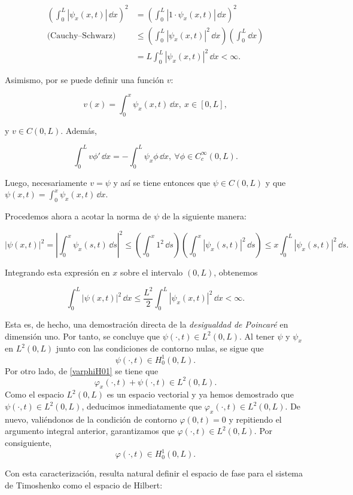 \begin{align*}
    \left (\int_0^L |\psi_x(x,t)| \, \dd x \right )^2 &= \left (\int_0^L |1 \cdot \psi_x(x,t)| \, \dd x \right )^2\\
    \text{(Cauchy–Schwarz)} &\leq \left (\int_0^L |\psi_x(x,t)|^2 \, \dd x \right ) \left (\int_0^L \dd x \right )\\
    &= L \int_0^L |\psi_x(x,t)|^2 \, \dd x < \infty.
\end{align*}

Asimismo, por \cite[Lema~8.2]{brezis-2011-fun-ana-sob} se puede definir una función $v$:

\[v(x) = \int_0^x \psi_x(x,t) \, \dd x, \ x \in [0,L],\]

y $v \in C(0,L)$. Además, 

\[\int_0^L v \phi ' \, \dd x = - \int_0^L \psi_x \phi \, \dd x, \ \forall \phi \in C_c^\infty(0,L).\]

Luego, necesariamente $v = \psi$ y así se tiene entonces que $\psi \in C(0,L)$ y que $\psi(x,t) = \int_0^x \psi_x(x,t) \, \dd x $. 

Procedemos ahora a acotar la norma de $\psi$ de la siguiente manera:

\[
|\psi(x,t)|^2 = \left| \int_0^x \psi_x(s,t) \, \dd s \right|^2 \leq \left( \int_0^x 1^2 \, \dd s \right) \left( \int_0^x |\psi_x(s,t)|^2 \, \dd s \right) \leq x \int_0^L |\psi_x(s,t)|^2 \, \dd s.
\]

Integrando esta expresión en $x$ sobre el intervalo $(0,L)$, obtenemos

\[
\int_0^L |\psi(x,t)|^2 \, \dd x \leq \frac{L^2}{2} \int_0^L |\psi_x(x,t)|^2 \, \dd x < \infty.
\]

Esta es, de hecho, una demostración directa de la \textit{desigualdad de Poincaré} en dimensión uno. Por tanto, se concluye que $\psi(\cdot,t) \in L^2(0,L)$. Al tener $\psi$ y $\psi_x$ en $L^2(0,L)$ junto con las condiciones de contorno nulas, se sigue que
\[
\psi(\cdot,t)\in H_0^1(0,L).
\]
Por otro lado, de \eqref{varphiH01} se tiene que
\[
\varphi_x(\cdot,t)+\psi(\cdot,t)\in L^2(0,L).
\]
Como el espacio $L^2(0,L)$ es un espacio vectorial y ya hemos demostrado que $\psi(\cdot,t)\in L^2(0,L)$, deducimos inmediatamente que $\varphi_x(\cdot,t)\in L^2(0,L)$. De nuevo, valiéndonos de la condición de contorno $\varphi(0,t) = 0$ y repitiendo el argumento integral anterior, garantizamos que $\varphi(\cdot,t) \in L^2(0,L)$. Por consiguiente,
\[
\varphi(\cdot,t)\in H_0^1(0,L).
\]

Con esta caracterización, resulta natural definir el espacio de fase para el sistema de Timoshenko como el espacio de Hilbert\footnotemark:


